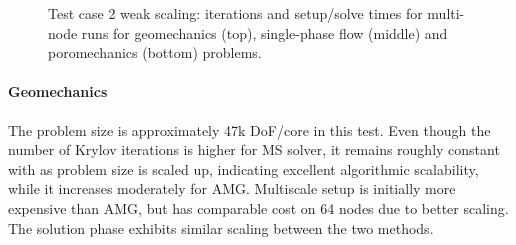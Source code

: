 \begin{figure} [htbp]
  \begin{subfigure}[t]{0.48\textwidth}
    \centering
    
  \end{subfigure}
  \hfill
  \begin{subfigure}[t]{0.48\textwidth}
    \centering
    
  \end{subfigure}
  \begin{subfigure}[t]{0.48\textwidth}
    \centering
    
  \end{subfigure}
  \hfill
  \begin{subfigure}[t]{0.48\textwidth}
    \centering
    
  \end{subfigure}
  \begin{subfigure}[t]{0.48\textwidth}
    \centering
    
  \end{subfigure}
  \hfill
  \begin{subfigure}[t]{0.48\textwidth}
    \centering
    
  \end{subfigure}
  \caption[Test case 2 weak scaling]{Test case 2 weak scaling: iterations and setup/solve times for multi-node runs for geomechanics (top), single-phase flow (middle) and poromechanics (bottom) problems.}
  \label{fig:mazumodel2_scaling_weak}
\end{figure}

\paragraph{Geomechanics}
The problem size is approximately 47k DoF/core in this test.   Even though the number of Krylov iterations is higher for MS solver, it remains roughly constant with as problem size is scaled up, indicating excellent algorithmic scalability, while it increases moderately for AMG.   Multiscale setup is initially more expensive than AMG, but has comparable cost on 64 nodes due to better scaling.   The solution phase exhibits similar scaling between the two methods.

